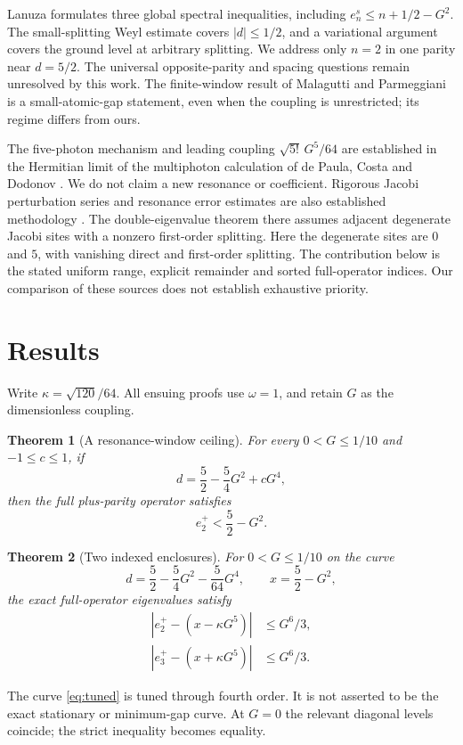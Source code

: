 \documentclass[11pt]{article}
\newtheorem{theorem}{Theorem}
\newcommand{\abs}[1]{\left|#1\right|}
\begin{document}
Lanuza \cite{Lanuza} formulates three global spectral inequalities, including $e_n^s\leq n+1/2-G^2$. The small-splitting Weyl estimate covers $|d|\leq1/2$, and a variational argument covers the ground level at arbitrary splitting. We address only $n=2$ in one parity near $d=5/2$. The universal opposite-parity and spacing questions remain unresolved by this work. The finite-window result of Malagutti and Parmeggiani \cite{Malagutti} is a small-atomic-gap statement, even when the coupling is unrestricted; its regime differs from ours.

The five-photon mechanism and leading coupling $\sqrt{5!}\,G^5/64$ are established in the Hermitian limit of the multiphoton calculation of de Paula, Costa and Dodonov \cite{Paula}. We do not claim a new resonance or coefficient. Rigorous Jacobi perturbation series and resonance error estimates are also established methodology \cite{Charif}. The double-eigenvalue theorem there assumes adjacent degenerate Jacobi sites with a nonzero first-order splitting. Here the degenerate sites are $0$ and $5$, with vanishing direct and first-order splitting. The contribution below is the stated uniform range, explicit remainder and sorted full-operator indices. Our comparison of these sources does not establish exhaustive priority.

\section{Results}
Write $\kappa=\sqrt{120}/64$. All ensuing proofs use $\omega=1$, and retain $G$ as the dimensionless coupling.
\begin{theorem}[A resonance-window ceiling]\label{thm:A}
For every $0<G\leq1/10$ and $-1\leq c\leq1$, if
\begin{equation}\label{eq:window}
d=\frac52-\frac54G^2+cG^4,
\end{equation}
then the full plus-parity operator satisfies
\[
e_2^+<\frac52-G^2.
\]
\end{theorem}
\begin{theorem}[Two indexed enclosures]\label{thm:B}
For $0<G\leq1/10$ on the curve
\begin{equation}\label{eq:tuned}
d=\frac52-\frac54G^2-\frac5{64}G^4,
\qquad x=\frac52-G^2,
\end{equation}
the exact full-operator eigenvalues satisfy
\begin{align}
\abs{e_2^+-(x-\kappa G^5)}&\leq G^6/3,\label{eq:lower}\\
\abs{e_3^+-(x+\kappa G^5)}&\leq G^6/3.\label{eq:upper}
\end{align}
\end{theorem}
The curve \eqref{eq:tuned} is tuned through fourth order. It is not asserted to be the exact stationary or minimum-gap curve. At $G=0$ the relevant diagonal levels coincide; the strict inequality becomes equality.
\end{document}
